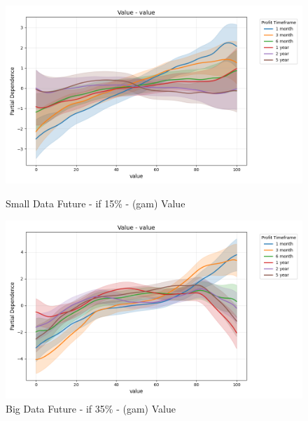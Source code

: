 \documentclass[11pt,english,a4paper,hidelinks]{book}
\begin{document}
\begin{figure}[H]
    \centering
    \begin{minipage}{0.48\textwidth}
        \centering
        \includegraphics[width=\textwidth]{images/code/models/general_regression/splines/2D/Small Data future - IF/value_value.png}
        \caption{Small Data Future - \acrshort{if} 15\% - (\acrshort{gam}) Value}
        \label{fig:spline_value_value}
    \end{minipage}\hfill
    \begin{minipage}{0.48\textwidth}
        \centering
        \includegraphics[width=\textwidth]{images/code/models/general_regression/splines/2D/Big Data future - IF HARD Balanced/value_value.png}
        \caption{Big Data Future - \acrshort{if} 35\% - (\acrshort{gam}) Value}
        \label{fig:spline_value_value_balanced}
    \end{minipage}
\end{figure}
\end{document}
